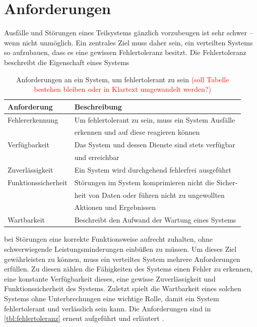 \documentclass[12pt,a4paper,parskip=half]{scrreprt}
\begin{document}
	\section{Anforderungen}
	Ausfälle und Störungen eines Teilsystems gänzlich vorzubeugen ist sehr schwer -- wenn nicht unmöglich. Ein zentrales Ziel muss daher sein, ein verteilten Systems so aufzubauen, dass es eine gewissen Fehlertoleranz besitzt. Die Fehlertoleranz beschreibt die Eigenschaft eines Systems 
	\begin{table}[h]
		\centering
		\begin{tabular}[h]{ll}
			\toprule
			Anforderung 		& Beschreibung \\
			\midrule
			Fehlererkennung		& Um fehlertolerant zu sein, muss ein System Ausfälle\\
			& erkennen und auf diese reagieren können \vspace{4pt} \\
			Verfügbarkeit 		& Das System und dessen Dienste sind stets verfügbar \\
			& und erreichbar \vspace{4pt}\\
			Zuverlässigkeit		& Ein System wird durchgehend fehlerfrei ausgeführt  \vspace{4pt} \\
			Funktionssicherheit	& Störungen im System komprimieren nicht die Sicher-\\
			& heit von Daten oder führen nicht zu ungewollten \\
			& Aktionen und Ergebnissen \vspace{4pt}\\
			Wartbarkeit 		& Beschreibt den Aufwand der Wartung eines Systems\\		
			\bottomrule
		\end{tabular}
		\captionsetup{font = small}
		\caption{Anforderungen an ein System, um fehlertolerant zu sein 
			\textcolor{red}{(soll Tabelle bestehen bleiben oder in Klartext umgewandelt werden?)}}
		\label{tbl:fehlertoleranz}
	\end{table}
	bei Störungen eine korrekte Funktionsweise aufrecht zuhalten, ohne schwerwiegende Leistungsminderungen einbüßen zu müssen. Um dieses Ziel gewährleisten zu können, muss ein verteiltes System mehrere Anforderungen erfüllen. Zu diesen zählen die Fähigkeiten des Systems einen Fehler zu erkennen, eine konstante Verfügbarkeit dieses, eine gewisse Zuverlässigkeit und Funktionssicherheit des Systems. Zuletzt spielt die Wartbarkeit eines solchen Systems ohne Unterbrechungen eine wichtige Rolle, damit ein System fehlertolerant und verlässlich sein kann. Die Anforderungen sind in \autoref{tbl:fehlertoleranz} erneut aufgeführt und erläutert \cite{vS-TU-Braunschweig}. 
	
\end{document}
